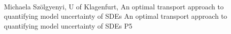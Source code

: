     \\\hline
{}	%
{}		%
{Michaela Szölgyenyi, U of Klagenfurt, An optimal transport approach to quantifying model uncertainty of SDEs}	%
{An optimal transport approach to quantifying model uncertainty of SDEs}		%
{P5}		%
\\\hline
